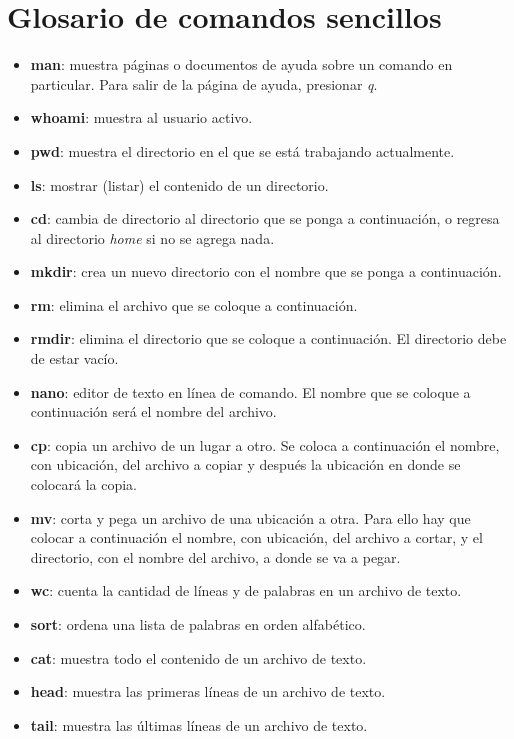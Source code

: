 \documentclass[10pt,letterpaper]{article}
\begin{document}
\section{Glosario de comandos sencillos}
\begin{small}

\begin{itemize}
\item \textbf{man}: muestra p\'aginas o documentos de ayuda sobre un comando en particular. Para salir de la p\'agina de ayuda, presionar \emph{q}.
\item \textbf{whoami}: muestra al usuario activo.
\item \textbf{pwd}: muestra el directorio en el que se est\'a trabajando actualmente.
\item \textbf{ls}: mostrar (listar) el contenido de un directorio.
\item \textbf{cd}: cambia de directorio al directorio que se ponga a continuaci\'on, o regresa al directorio \emph{home} si no se agrega nada.
\item \textbf{mkdir}: crea un nuevo directorio con el nombre que se ponga a continuaci\'on.
\item \textbf{rm}: elimina el archivo que se coloque a continuaci\'on.
\item \textbf{rmdir}: elimina el directorio que se coloque a continuaci\'on. El directorio debe de estar vac\'io.
\item \textbf{nano}: editor de texto en l\'inea de comando. El nombre que se coloque a continuaci\'on ser\'a el nombre del archivo.
\item \textbf{cp}: copia un archivo de un lugar a otro. Se coloca a continuaci\'on el nombre, con ubicaci\'on, del archivo a copiar y despu\'es la ubicaci\'on en donde se colocar\'a la copia.
\item \textbf{mv}: corta y pega un archivo de una ubicaci\'on a otra. Para ello hay que colocar a continuaci\'on el nombre, con ubicaci\'on, del archivo a cortar, y el directorio, con el nombre del archivo, a donde se va a pegar.
\item \textbf{wc}: cuenta la cantidad de l\'ineas y de palabras en un archivo de texto.
\item \textbf{sort}: ordena una lista de palabras en orden alfab\'etico.
\item \textbf{cat}: muestra todo el contenido de un archivo de texto.
\item \textbf{head}: muestra las primeras l\'ineas de un archivo de texto.
\item \textbf{tail}: muestra las \'ultimas l\'ineas de un archivo de texto.

\end{itemize}
\end{small}
\end{document}
